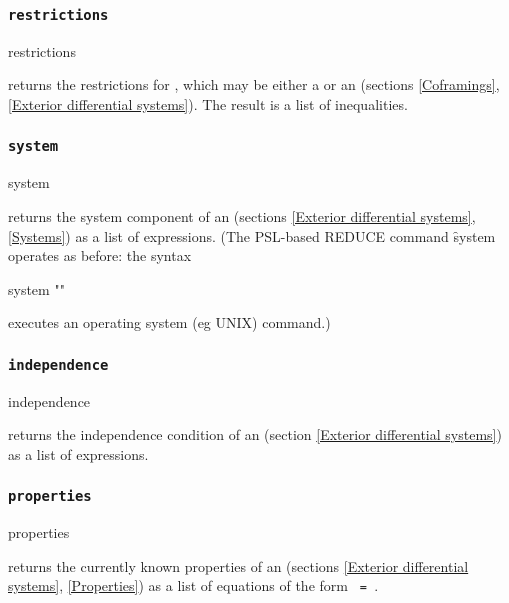 \subsubsection{\tt restrictions}
\label{restrictions}

\begin{edssyntax}
	restrictions 
\end{edssyntax}
returns the restrictions for , which may be either a
 or an  (sections \ref{Coframings}, \ref{Exterior
differential systems}). The result is a list of inequalities.

\subsubsection{\tt system}
\label{system}

\begin{edssyntax}
	system 
\end{edssyntax}
returns the system component of an  (sections \ref{Exterior
differential systems}, \ref{Systems}) as a list of 
expressions. (The PSL-based REDUCE command \f{system} operates as before:
the syntax
\begin{edssyntax}
	system ""
\end{edssyntax}
executes an operating system (eg UNIX) command.)

\subsubsection{\tt independence}
\label{independence}

\begin{edssyntax}
	independence 
\end{edssyntax}
returns the independence condition of an  (section \ref{Exterior
differential systems}) as a list of  expressions.


\subsubsection{\tt properties}
\label{properties}

\begin{edssyntax}
	properties 
\end{edssyntax}
returns the currently known properties of an  (sections
\ref{Exterior differential systems}, \ref{Properties}) as a list of
equations of the form {\tt{} = }.

